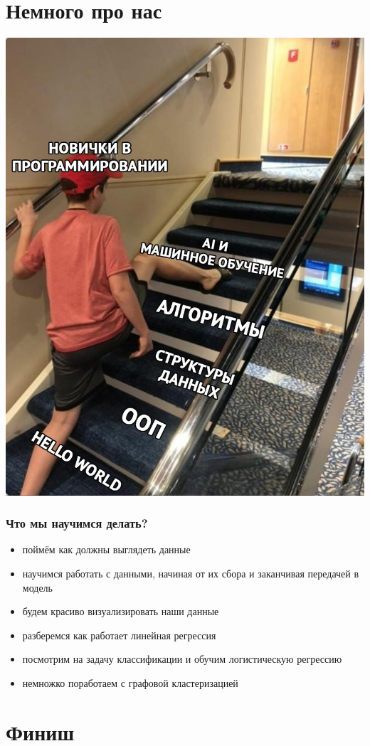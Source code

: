 \documentclass[aspectratio=169,newPxFont]{beamer}
\begin{document}
\section{Немного про нас}

\begin{frame}{}
\centering \includegraphics[width=0.48\linewidth]{we.jpg}\\
\end{frame}

\begin{frame}
\frametitle{Что мы научимся делать?}
\begin{itemize}
	\item поймём как должны выглядеть данные
	\item научимся работать с данными, начиная от их сбора и заканчивая передачей в модель
	\item будем красиво визуализировать наши данные
	\item разберемся как работает линейная регрессия
	\item посмотрим на задачу классификации и обучим логистическую регрессию
	\item немножко поработаем с графовой кластеризацией
\end{itemize}
\end{frame}

\section{Финиш}


%
\end{document}
